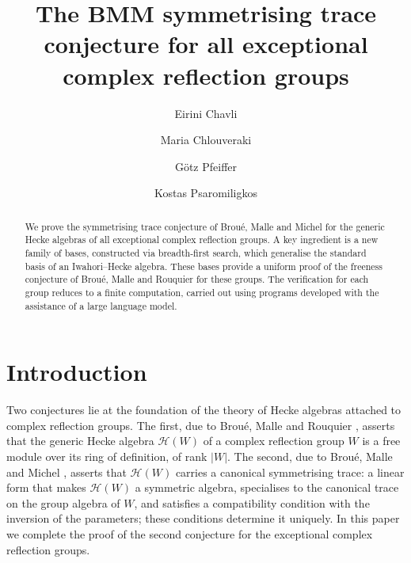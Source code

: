 \documentclass[11pt, reqno]{amsart}
\title[The BMM conjecture for all exceptional complex reflection groups]{The BMM symmetrising trace conjecture for all exceptional complex reflection groups}
\author{Eirini Chavli}
\author{Maria Chlouveraki}
\author{G\"otz Pfeiffer}
\author{Kostas Psaromiligkos}
\date{}
\numberwithin{equation}{section}
\theoremstyle{remark}
\begin{document}
	
		
	\maketitle
	

	
	\begin{abstract}
	We prove the symmetrising trace conjecture of Broué, Malle and Michel for the generic Hecke algebras of all exceptional complex reflection groups. A key ingredient is a new family of bases, constructed via breadth-first search, which generalise the standard basis of an Iwahori–Hecke algebra. These bases provide a uniform proof of the freeness conjecture of Broué, Malle and Rouquier for these groups. The verification for each group reduces to a finite computation, carried out using programs developed with the assistance of a large language model.
	\end{abstract}
	
	\maketitle
	
		
	\section{Introduction}


Two conjectures lie at the foundation of the theory of Hecke algebras
attached to complex reflection groups. The first, due to Brou\'e,
Malle and Rouquier \cite{BMR}, asserts that the generic Hecke algebra
$\mathcal H(W)$ of a complex reflection group $W$ is a free module over
its ring of definition, of rank $|W|$. The second, due to Brou\'e,
Malle and Michel \cite{BMM}, asserts that $\mathcal H(W)$ carries a
canonical symmetrising trace: a linear form that makes $\mathcal H(W)$
a symmetric algebra, specialises to the canonical trace on the group
algebra of $W$, and satisfies a compatibility condition with the
inversion of the parameters; these conditions determine it uniquely.
In this paper we complete the proof of the second conjecture for the
exceptional complex reflection groups.
\end{document}
